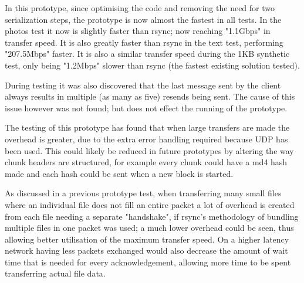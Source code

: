 In this prototype, since optimising the code and removing the need for two serialization steps, the prototype is now almost the fastest in all tests. In the photos test it now is slightly faster than rsync; now reaching "1.1Gbps" in transfer speed. It is also greatly faster than rsync in the text test, performing "207.5Mbps" faster. It is also a similar transfer speed during the 1KB synthetic test, only being "1.2Mbps" slower than rsync (the fastest existing solution tested).

During testing it was also discovered that the last message sent by the client always results in multiple (as many as five) resends being sent. The cause of this issue however was not found; but does not effect the running of the prototype.

The testing of this prototype has found that when large transfers are made the overhead is greater, due to the extra error handling required because UDP has been used. This could likely be reduced in future prototypes by altering the way chunk headers are structured, for example every chunk could have a md4 hash made and each hash could be sent when a new block is started.

As discussed in a previous prototype test, when transferring many small files where an individual file does not fill an entire packet a lot of overhead is created from each file needing a separate "handshake", if rsync's methodology of bundling multiple files in one packet was used; a much lower overhead could be seen, thus allowing better utilisation of the maximum transfer speed. On a higher latency network having less packets exchanged would also decrease the amount of wait time that is needed for every acknowledgement, allowing more time to be spent transferring actual file data.
